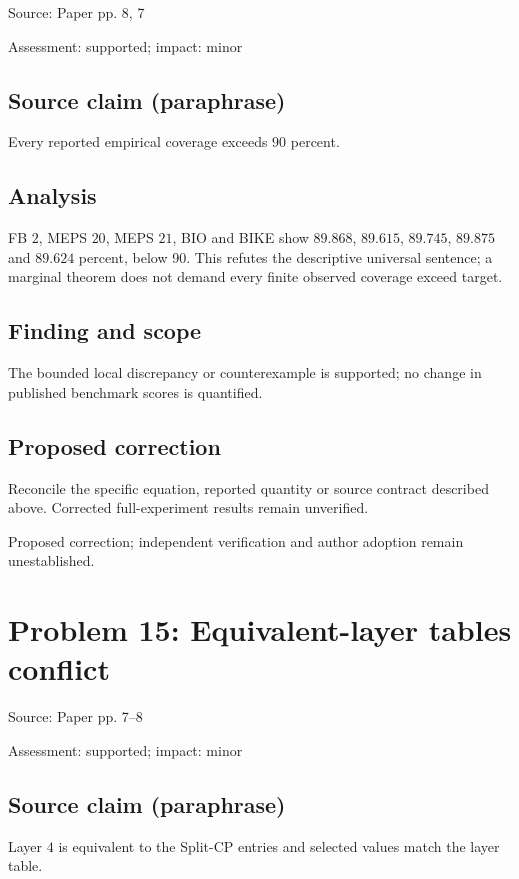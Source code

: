 \documentclass[11pt]{article}
\begin{document}
Source: Paper pp. 8, 7

Assessment: supported; impact: minor

\subsection*{Source claim (paraphrase)}

Every reported empirical coverage exceeds \(90\) percent.

\subsection*{Analysis}

FB \(2\), MEPS \(20\), MEPS \(21\), BIO and BIKE show \(89.868\), \(89.615\), \(89.745\), \(89.875\) and \(89.624\) percent, below 90. This refutes the descriptive universal sentence; a marginal theorem does not demand every finite observed coverage exceed target.

\subsection*{Finding and scope}

The bounded local discrepancy or counterexample is supported; no change in published benchmark scores is quantified.

\subsection*{Proposed correction}

Reconcile the specific equation, reported quantity or source contract described above. Corrected full-experiment results remain unverified.

Proposed correction; independent verification and author adoption remain unestablished.

\section*{Problem 15: Equivalent-layer tables conflict}

Source: Paper pp. 7–8

Assessment: supported; impact: minor

\subsection*{Source claim (paraphrase)}

Layer \(4\) is equivalent to the Split-CP entries and selected values match the layer table.
\end{document}

